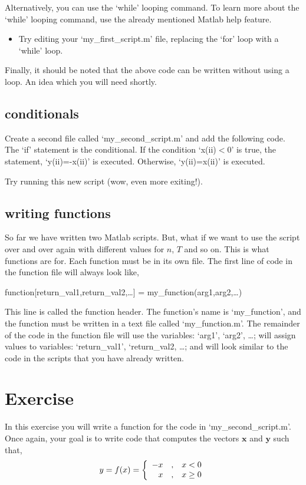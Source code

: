 \documentclass[letter]{article}
\begin{document}
Alternatively, you can use the `while' looping command.  To
learn more about the `while' looping command, use the already
mentioned Matlab help feature.

\begin{itemize}
\item Try editing your `my\_first\_script.m' file, replacing the `for' loop
with a `while' loop.
\end{itemize}

Finally, it should be noted that the above code can be written without
using a loop.  An idea which you will need shortly.

\subsection*{conditionals}
Create a second file called `my\_second\_script.m' and add the
following code.  The `if' statement is the conditional.  If the
condition `x(ii)$<$0' is true, the statement, `y(ii)=-x(ii)' is
executed.  Otherwise, `y(ii)=x(ii)' is executed.



Try running this new script (wow, even more exiting!).

\subsection*{writing functions}
So far we have written two Matlab scripts.  But, what if we want to
use the script over and over again with different values for $n$, $T$
and so on.  This is what functions are for.  Each function must be in
its own file.  The first line of code in the function file will always
look like,\\

\centerline{function[return\_val1,return\_val2,\ldots] =
my\_function(arg1,arg2,\ldots)}\vspace{.5cm}

This line is called the function header. The function's name is
`my\_function', and the function must be written in a text
file called `my\_function.m'.  The remainder of the code in the
function file will use the variables: `arg1', `arg2', \ldots; will
assign values to variables: `return\_val1', `return\_val2, \ldots; and
will look similar to the code in the scripts that you have already written.

\section*{Exercise}
In this exercise you will write a function for the code in
`my\_second\_script.m'.  Once again, your goal is to write code that
computes the vectors $\mathbf{x}$ and $\mathbf{y}$ such that,
\begin{equation}
  y=f(x)=
  \left\{
  \begin{array}{r@{\quad,\quad}l}
    -x & x < 0\\
    x  & x \geq 0
  \end{array}
  \right.
  \label{eqn:saw}
\end{equation}
\end{document}
